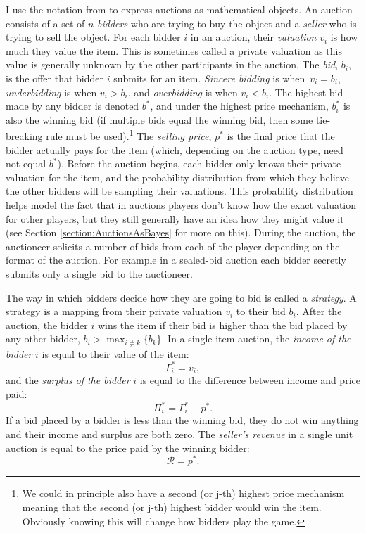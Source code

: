 \documentclass[12pt,twoside]{reedthesis}
\begin{document}
I use the notation from \cite{Mochon2015} to express auctions as mathematical objects. An auction consists of a set of $n$ {\em bidders} who are trying to buy the object and a {\em seller} who is trying to sell the object. For each bidder $i$ in an auction, their {\em valuation} $v_i$ is how much they value the item. This is sometimes called a private valuation as this value is generally unknown by the other participants in the auction. The \textit{bid}, $b_i$, is the offer that bidder $i$ submits for an item. {\em Sincere bidding} is when~$v_i = b_i$, {\em underbidding} is when $v_i > b_i$, and {\em overbidding} is when $v_i < b_i$. The highest bid made by any bidder is denoted $b^*$, and under the highest price mechanism, $b^*_i$ is also the winning bid (if multiple bids equal the winning bid, then some tie-breaking rule must be used).\footnote{We could in principle also have a second (or j-th) highest price mechanism meaning that the second (or j-th) highest bidder would win the item. Obviously knowing this will change how bidders play the game.} The \textit{selling price}, $p^*$ is the final price that the bidder actually pays for the item (which, depending on the auction type, need not equal $b^*$). Before the auction begins, each bidder only knows their private valuation for the item, and the probability distribution from which they believe the other bidders will be sampling their valuations. This probability distribution helps model the fact that in auctions players don't know how the exact valuation for other players, but they still generally have an idea how they might value it (see Section \ref{section:AuctionsAsBayes} for more on this). During the auction, the auctioneer solicits a number of bids from each of the player depending on the format of the auction. For example in a sealed-bid auction each bidder secretly submits only a single bid to the auctioneer. 

The way in which bidders decide how they are going to bid is called a {\em strategy}. A strategy is a mapping from their private valuation $v_i$ to their bid $b_i$. After the auction, the bidder $i$ wins the item if their bid is higher than the bid placed by any other bidder, $b_i > \max_{i \neq k} \{b_k\}$. In a single item auction, the {\em income of the bidder} $i$ is equal to their value of the item: $$ \Gamma_i^* = v_i,$$ and the {\em surplus of the bidder} $i$ is equal to the difference between income and price paid: $$ \Pi_i^* = \Gamma_i^* - p^*.$$ If a bid placed by a bidder is less than the winning bid, they do not win anything and their income and surplus are both zero. The {\em seller's revenue} in a single unit auction is equal to the price paid by the winning bidder: $$ \mathcal{R} = p^*.$$ 
\end{document}
